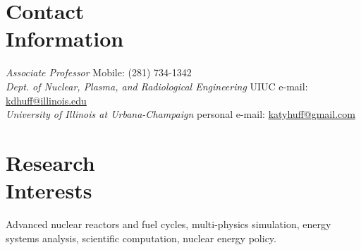 \documentclass[margin,line]{resume}
\begin{document}
\begin{resume}

%


    \section{\mysidestyle Contact\\Information}
        \textsl{Associate Professor}
        \hfill Mobile: (281) 734-1342 \vspace{0mm}\\\vspace{0mm}%
        \textsl{Dept. of Nuclear, Plasma, and Radiological Engineering}
        \hfill UIUC e-mail: \href{mailto:kdhuff@illinois.edu}{kdhuff@illinois.edu}       \vspace{0mm}\\\vspace{0mm}%
        \textsl{University of Illinois at Urbana-Champaign}
        \hfill personal e-mail: 
        \href{mailto:katyhuff@gmail.com}{katyhuff@gmail.com}       \vspace{0mm}\\\vspace{-4mm}%

    \section{\mysidestyle Research\\Interests}
                Advanced nuclear reactors and fuel cycles, multi-physics
                simulation, energy systems analysis,
                scientific computation, nuclear energy policy.

\end{resume}
\end{document}
